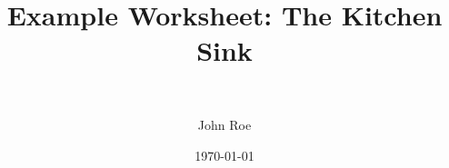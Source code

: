 \documentclass[11pt]{article}



\usepackage{tikz}
\newcommand{\R}{\mathbb{R}}
\newcommand{\E}{\mathbb{E}}
\newcommand{\KL}[2]{D_{\mathrm{KL}}\!\left(#1 \,\middle\|\, #2\right)}
\DeclareMathOperator*{\argmax}{arg\,max}

\title{Example Worksheet: The Kitchen Sink}
\author{\\ 
  \and John Roe}
\date{\today}


\maketitle

\begin{summary}
A dummy worksheet demonstrating every construct the pipeline supports.
\end{summary}

